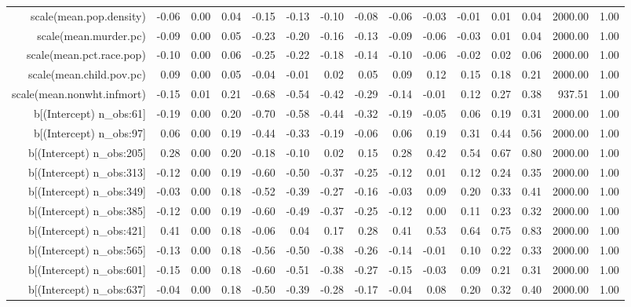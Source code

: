 \begin{table}[ht]
\begin{tabular}{rrrrrrrrrrrrrrr}
  scale(mean.pop.density) & -0.06 & 0.00 & 0.04 & -0.15 & -0.13 & -0.10 & -0.08 & -0.06 & -0.03 & -0.01 & 0.01 & 0.04 & 2000.00 & 1.00 \\ 
  scale(mean.murder.pc) & -0.09 & 0.00 & 0.05 & -0.23 & -0.20 & -0.16 & -0.13 & -0.09 & -0.06 & -0.03 & 0.01 & 0.04 & 2000.00 & 1.00 \\ 
  scale(mean.pct.race.pop) & -0.10 & 0.00 & 0.06 & -0.25 & -0.22 & -0.18 & -0.14 & -0.10 & -0.06 & -0.02 & 0.02 & 0.06 & 2000.00 & 1.00 \\ 
  scale(mean.child.pov.pc) & 0.09 & 0.00 & 0.05 & -0.04 & -0.01 & 0.02 & 0.05 & 0.09 & 0.12 & 0.15 & 0.18 & 0.21 & 2000.00 & 1.00 \\ 
  scale(mean.nonwht.infmort) & -0.15 & 0.01 & 0.21 & -0.68 & -0.54 & -0.42 & -0.29 & -0.14 & -0.01 & 0.12 & 0.27 & 0.38 & 937.51 & 1.00 \\ 
  b[(Intercept) n\_obs:61] & -0.19 & 0.00 & 0.20 & -0.70 & -0.58 & -0.44 & -0.32 & -0.19 & -0.05 & 0.06 & 0.19 & 0.31 & 2000.00 & 1.00 \\ 
  b[(Intercept) n\_obs:97] & 0.06 & 0.00 & 0.19 & -0.44 & -0.33 & -0.19 & -0.06 & 0.06 & 0.19 & 0.31 & 0.44 & 0.56 & 2000.00 & 1.00 \\ 
  b[(Intercept) n\_obs:205] & 0.28 & 0.00 & 0.20 & -0.18 & -0.10 & 0.02 & 0.15 & 0.28 & 0.42 & 0.54 & 0.67 & 0.80 & 2000.00 & 1.00 \\ 
  b[(Intercept) n\_obs:313] & -0.12 & 0.00 & 0.19 & -0.60 & -0.50 & -0.37 & -0.25 & -0.12 & 0.01 & 0.12 & 0.24 & 0.35 & 2000.00 & 1.00 \\ 
  b[(Intercept) n\_obs:349] & -0.03 & 0.00 & 0.18 & -0.52 & -0.39 & -0.27 & -0.16 & -0.03 & 0.09 & 0.20 & 0.33 & 0.41 & 2000.00 & 1.00 \\ 
  b[(Intercept) n\_obs:385] & -0.12 & 0.00 & 0.19 & -0.60 & -0.49 & -0.37 & -0.25 & -0.12 & 0.00 & 0.11 & 0.23 & 0.32 & 2000.00 & 1.00 \\ 
  b[(Intercept) n\_obs:421] & 0.41 & 0.00 & 0.18 & -0.06 & 0.04 & 0.17 & 0.28 & 0.41 & 0.53 & 0.64 & 0.75 & 0.83 & 2000.00 & 1.00 \\ 
  b[(Intercept) n\_obs:565] & -0.13 & 0.00 & 0.18 & -0.56 & -0.50 & -0.38 & -0.26 & -0.14 & -0.01 & 0.10 & 0.22 & 0.33 & 2000.00 & 1.00 \\ 
  b[(Intercept) n\_obs:601] & -0.15 & 0.00 & 0.18 & -0.60 & -0.51 & -0.38 & -0.27 & -0.15 & -0.03 & 0.09 & 0.21 & 0.31 & 2000.00 & 1.00 \\ 
  b[(Intercept) n\_obs:637] & -0.04 & 0.00 & 0.18 & -0.50 & -0.39 & -0.28 & -0.17 & -0.04 & 0.08 & 0.20 & 0.32 & 0.40 & 2000.00 & 1.00 \\ 

\end{tabular}
\end{table}
